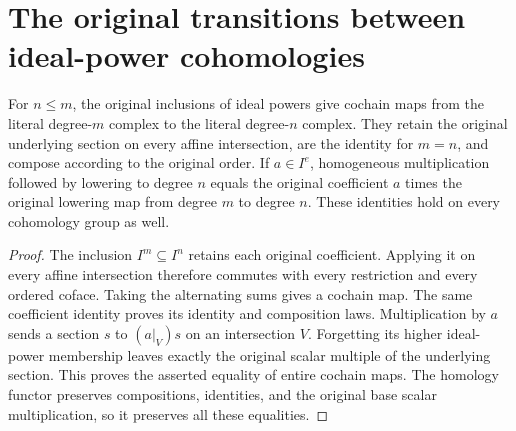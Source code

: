 \section{The original transitions between ideal-power cohomologies}

\begin{lemma}
\label{lem:fc-rees-cech-degree-transitions}
\leanok
{}
For $n\leq m$, the original inclusions of ideal powers give cochain maps
from the literal degree-$m$ complex to the literal degree-$n$ complex.
They retain the original underlying section on every affine intersection,
are the identity for $m=n$, and compose according to the original order.
If $a\in I^e$, homogeneous multiplication followed by lowering to degree
$n$ equals the original coefficient $a$ times the original lowering map
from degree $m$ to degree $n$.  These identities hold on every
cohomology group as well.
\end{lemma}
\begin{proof}
The inclusion $I^m\subseteq I^n$ retains each original coefficient.
Applying it on every affine intersection therefore commutes with every
restriction and every ordered coface.  Taking the alternating sums gives
a cochain map.  The same coefficient identity proves its identity and
composition laws.  Multiplication by $a$ sends a section $s$ to
$(a|_V)s$ on an intersection $V$.  Forgetting its higher ideal-power
membership leaves exactly the original scalar multiple of the
underlying section.  This proves the asserted equality of entire
cochain maps.  The homology functor preserves compositions, identities,
and the original base scalar multiplication, so it preserves all these
equalities.
\end{proof}
